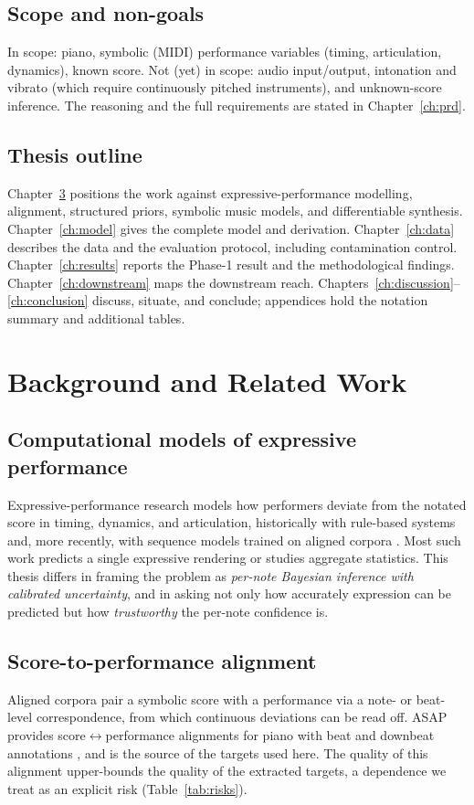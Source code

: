 \documentclass[11pt,a4paper]{report}
\begin{document}
\section{Scope and non-goals}
In scope: piano, symbolic (MIDI) performance variables (timing, articulation,
dynamics), known score. Not (yet) in scope: audio input/output, intonation and
vibrato (which require continuously pitched instruments), and unknown-score
inference. The reasoning and the full requirements are stated in
Chapter~\ref{ch:prd}.

\section{Thesis outline}
Chapter~\ref{ch:related} positions the work against expressive-performance
modelling, alignment, structured priors, symbolic music models, and differentiable
synthesis. Chapter~\ref{ch:model} gives the complete model and derivation.
Chapter~\ref{ch:data} describes the data and the evaluation protocol, including
contamination control. Chapter~\ref{ch:results} reports the Phase-1 result and the
methodological findings. Chapter~\ref{ch:downstream} maps the downstream reach.
Chapters~\ref{ch:discussion}--\ref{ch:conclusion} discuss, situate, and conclude;
appendices hold the notation summary and additional tables.

\chapter{Background and Related Work}\label{ch:related}

\section{Computational models of expressive performance}
Expressive-performance research models how performers deviate from the notated
score in timing, dynamics, and articulation, historically with rule-based systems
and, more recently, with sequence models trained on aligned corpora
\cite{cancino2018,oore2018}. Most such work predicts a single expressive rendering
or studies aggregate statistics. This thesis differs in framing the problem as
\emph{per-note Bayesian inference with calibrated uncertainty}, and in asking not
only how accurately expression can be predicted but how \emph{trustworthy} the
per-note confidence is.

\section{Score-to-performance alignment}
Aligned corpora pair a symbolic score with a performance via a note- or beat-level
correspondence, from which continuous deviations can be read off. ASAP provides
score$\leftrightarrow$performance alignments for piano with beat and downbeat
annotations \cite{asap}, and is the source of the targets used here. The quality of
this alignment upper-bounds the quality of the extracted targets, a dependence we
treat as an explicit risk (Table~\ref{tab:risks}).
\end{document}
